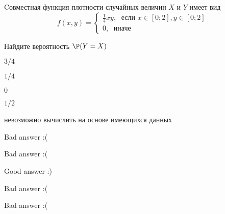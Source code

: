 
\begin{question}
Cовместная функция плотности случайных величин \(X\) и \(Y\) имеет вид
\[
f(x,y)=\begin{cases}
\frac{1}{4}xy, \; \text{ если } x\in[0;2], y\in [0;2] \\
0, \; \text{ иначе}
\end{cases}
\]

Найдите вероятность \(\P(Y = X)\)
\begin{answerlist}
  \item \(3/4\)
  \item \(1/4\)
  \item \(0\)
  \item \(1/2\)
  \item невозможно вычислить на основе имеющихся данных
\end{answerlist}
\end{question}

\begin{solution}
\begin{answerlist}
  \item Bad answer :(
  \item Bad answer :(
  \item Good answer :)
  \item Bad answer :(
  \item Bad answer :(
\end{answerlist}
\end{solution}

